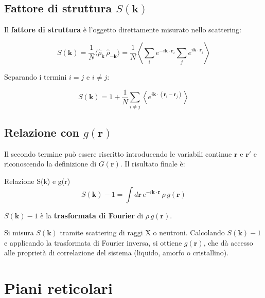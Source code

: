 \subsection*{Fattore di struttura $S(\mathbf{k})$}

Il \textbf{fattore di struttura} è l'oggetto direttamente misurato nello scattering:

\begin{equation}
S(\mathbf{k}) = \frac{1}{N} \langle \hat{\rho}_{\mathbf{k}} \, \hat{\rho}_{-\mathbf{k}} \rangle = \frac{1}{N} \left\langle \sum_{i} e^{-i\mathbf{k} \cdot \mathbf{r}_i} \sum_{j} e^{i\mathbf{k} \cdot \mathbf{r}_j} \right\rangle
\end{equation}

Separando i termini $i = j$ e $i \neq j$:

$$S(\mathbf{k}) = 1 + \frac{1}{N} \sum_{i \neq j} \left\langle e^{i\mathbf{k} \cdot (\mathbf{r}_i - \mathbf{r}_j)} \right\rangle$$

\subsection*{Relazione con $g(\mathbf{r})$}

Il secondo termine può essere riscritto introducendo le variabili continue $\mathbf{r}$ e $\mathbf{r}'$ e riconoscendo la definizione di $G(\mathbf{r})$. Il risultato finale è:

\begin{equazione}{Relazione S(k) e g(r)}
\begin{equation}
S(\mathbf{k}) - 1 = \int d\mathbf{r} \, e^{-i\mathbf{k} \cdot \mathbf{r}} \, \rho \, g(\mathbf{r})
\end{equation}
\end{equazione}

$S(\mathbf{k}) - 1$ è la \textbf{trasformata di Fourier} di $\rho \, g(\mathbf{r})$.

\begin{nota}
Si misura $S(\mathbf{k})$ tramite scattering di raggi X o neutroni. Calcolando $S(\mathbf{k}) - 1$ e applicando la trasformata di Fourier inversa, si ottiene $g(\mathbf{r})$, che dà accesso alle proprietà di correlazione del sistema (liquido, amorfo o cristallino).
\end{nota}

\section{Piani reticolari}

